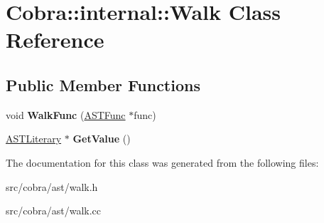 \hypertarget{class_cobra_1_1internal_1_1_walk}{\section{Cobra\+:\+:internal\+:\+:Walk Class Reference}
\label{class_cobra_1_1internal_1_1_walk}
}
\subsection*{Public Member Functions}
\begin{DoxyCompactItemize}
\item 
\hypertarget{class_cobra_1_1internal_1_1_walk_aeb790c70523ebd3dfd4859f9797c1848}{void {\bfseries Walk\+Func} (\hyperlink{class_cobra_1_1internal_1_1_a_s_t_func}{A\+S\+T\+Func} $\ast$func)}\label{class_cobra_1_1internal_1_1_walk_aeb790c70523ebd3dfd4859f9797c1848}

\item 
\hypertarget{class_cobra_1_1internal_1_1_walk_a5597ac18f63b90d1f1195bf8efd7c130}{\hyperlink{class_cobra_1_1internal_1_1_a_s_t_literary}{A\+S\+T\+Literary} $\ast$ {\bfseries Get\+Value} ()}\label{class_cobra_1_1internal_1_1_walk_a5597ac18f63b90d1f1195bf8efd7c130}

\end{DoxyCompactItemize}


The documentation for this class was generated from the following files\+:\begin{DoxyCompactItemize}
\item 
src/cobra/ast/walk.\+h\item 
src/cobra/ast/walk.\+cc\end{DoxyCompactItemize}
